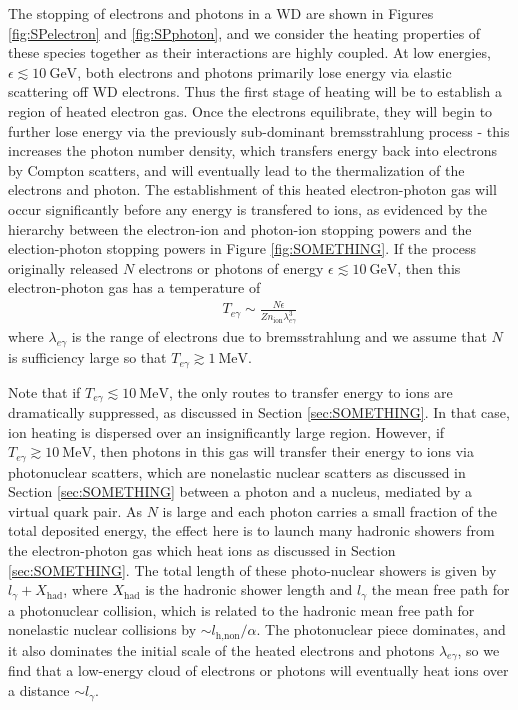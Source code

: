 \documentclass[twocolumn,showpacs,preprintnumbers,amsmath,amssymb,prd]{revtex4}
\newcommand{\GeV}{\text{GeV}}
\newcommand{\MeV}{\text{MeV}}
\begin{document}
The stopping of electrons and photons in a WD are shown in Figures \ref{fig:SPelectron} and \ref{fig:SPphoton}, and we consider the heating properties of these species together as their interactions are highly coupled.  
At low energies, $\epsilon \lesssim 10~\GeV$, both electrons and photons primarily lose energy via elastic scattering off WD electrons.
Thus the first stage of heating will be to establish a region of heated electron gas.
Once the electrons equilibrate, they will begin to further lose energy via the previously sub-dominant bremsstrahlung process - this increases the photon number density, which transfers energy back into electrons by Compton scatters, and will eventually lead to the thermalization of the electrons and photon. 
The establishment of this heated electron-photon gas will occur significantly before any energy is transfered to ions, as evidenced by the hierarchy between the electron-ion and photon-ion stopping powers and the election-photon stopping powers in Figure \ref{fig:SOMETHING}.
If the process originally released $N$ electrons or photons of energy $\epsilon \lesssim 10~\GeV$, then this electron-photon gas has a temperature of 
\begin{align}
  T_{e\gamma} \sim \frac{N \epsilon}{Z n_\text{ion} \lambda_{e\gamma}^3}
\end{align}
where $\lambda_{e\gamma}$ is the range of electrons due to bremsstrahlung and we assume that $N$ is sufficiency large so that $T_{e\gamma} \gtrsim 1~\MeV$.  

Note that if $T_{e\gamma} \lesssim 10~\MeV$, the only routes to transfer energy to ions are dramatically suppressed, as discussed in Section \ref{sec:SOMETHING}. 
In that case, ion heating is dispersed over an insignificantly large region. 
However, if $T_{e\gamma} \gtrsim 10~\MeV$, then photons in this gas will transfer their energy to ions via photonuclear scatters, which are nonelastic nuclear scatters as discussed in Section \ref{sec:SOMETHING} between a photon and a nucleus, mediated by a virtual quark pair.   
As $N$ is large and each photon carries a small fraction of the total deposited energy, the effect here is to launch many hadronic showers from the electron-photon gas which heat ions as discussed in Section \ref{sec:SOMETHING}.  
The total length of these photo-nuclear showers is given by $l_\gamma + X_\text{had}$, where $X_\text{had}$ is the hadronic shower length and $l_\gamma$ the mean free path for a photonuclear collision, which is related to the hadronic mean free path for nonelastic nuclear collisions by $\sim l_\text{h,non}/\alpha$.
The photonuclear piece dominates, and it also dominates the initial scale of the heated electrons and photons $\lambda_{e\gamma}$, so we find that a low-energy cloud of electrons or photons will eventually heat ions over a distance $\sim l_\gamma$.
\end{document}
